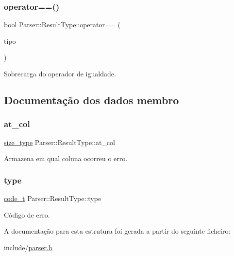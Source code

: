 \subsubsection{\texorpdfstring{operator==()}{operator==()}}
{\footnotesize\ttfamily bool Parser\+::\+Result\+Type\+::operator== (\begin{DoxyParamCaption}\item[{\hyperlink{structParser_1_1ResultType}{Result\+Type} \&}]{tipo }\end{DoxyParamCaption})\hspace{0.3cm}{\ttfamily [inline]}}



Sobrecarga do operador de igualdade. 



\subsection{Documentação dos dados membro}
\mbox{\label{structParser_1_1ResultType_acdb9aeac71c8dd81484e748414792a79}} 
\subsubsection{\texorpdfstring{at\+\_\+col}{at\_col}}
{\footnotesize\ttfamily \hyperlink{structParser_1_1ResultType_a8f110ce090aad3f4016d241aaef768db}{size\+\_\+type} Parser\+::\+Result\+Type\+::at\+\_\+col}



Armazena em qual coluna ocorreu o erro. 

\mbox{\label{structParser_1_1ResultType_a62bbb21f81f4754df9e59312b6a0203b}} 
\subsubsection{\texorpdfstring{type}{type}}
{\footnotesize\ttfamily \hyperlink{structParser_1_1ResultType_ac63a3ce34d7a6a119b1902372116d457}{code\+\_\+t} Parser\+::\+Result\+Type\+::type}



Código de erro. 



A documentação para esta estrutura foi gerada a partir do seguinte ficheiro\+:\begin{DoxyCompactItemize}
\item 
include/\hyperlink{parser_8h}{parser.\+h}\end{DoxyCompactItemize}
